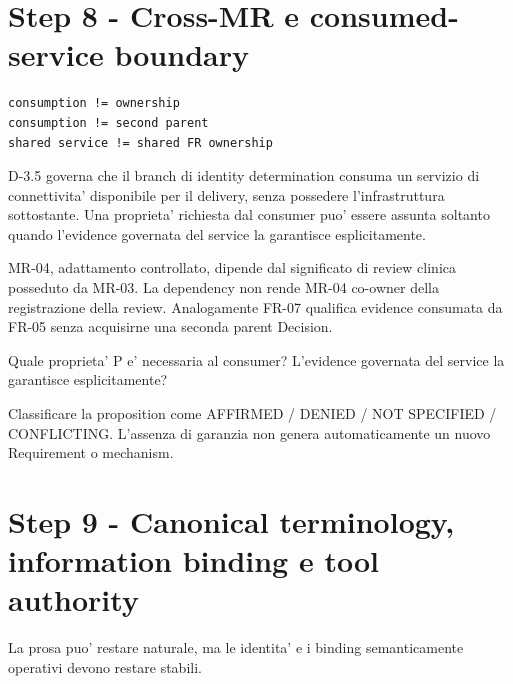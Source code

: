 \documentclass[11pt,a4paper]{article}
\begin{document}
\section{Step 8 - Cross-MR e consumed-service boundary}
\closedtag

\begin{lstlisting}
consumption != ownership
consumption != second parent
shared service != shared FR ownership
\end{lstlisting}

\begin{ddtaexample}[title={Facial Access - servizio di connettivita' consumato}]
D-3.5 governa che il branch di identity determination consuma un servizio di connettivita' disponibile per il delivery, senza possedere l'infrastruttura sottostante. Una proprieta' richiesta dal consumer puo' essere assunta soltanto quando l'evidence governata del service la garantisce esplicitamente.
\end{ddtaexample}

\begin{ddtaexample}[title={DermaTriage - dependency non e' ownership}]
MR-04, adattamento controllato, dipende dal significato di review clinica posseduto da MR-03. La dependency non rende MR-04 co-owner della registrazione della review. Analogamente FR-07 qualifica evidence consumata da FR-05 senza acquisirne una seconda parent Decision.
\end{ddtaexample}

\begin{ddtacheck}[title={Required property vs governed service guarantee}]
Quale proprieta' P e' necessaria al consumer? L'evidence governata del service la garantisce esplicitamente?\par
Classificare la proposition come AFFIRMED / DENIED / NOT SPECIFIED / CONFLICTING. L'assenza di garanzia non genera automaticamente un nuovo Requirement o mechanism.
\end{ddtacheck}

\section{Step 9 - Canonical terminology, information binding e tool authority}
\closedtag

La prosa puo' restare naturale, ma le identita' e i binding semanticamente operativi devono restare stabili.
\end{document}

